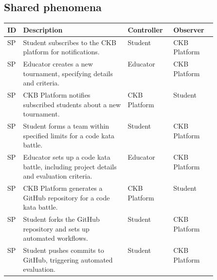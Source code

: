 \subsection{Shared phenomena}
\label{subsec:shared_phenomena}%
\setcounter{sp}{1}
\newcommand{\csp} {\thesp\stepcounter{sp}}
\begin{center}
    \begin{longtable}{ |l|p{0.5\linewidth}|l|l| }
        \hline
        \textbf{ID} & \textbf{Description}                                                                                                          & \textbf{Controller} & \textbf{Observer} \\
        \hline
        SP\csp      & Student subscribes to the CKB platform for notifications.\                                                                    & Student                 & CKB Platform             \\
        \hline
        SP\csp      & Educator creates a new tournament, specifying details and criteria.\                                                          & Educator                 & CKB Platform            \\
        \hline
        SP\csp      & CKB Platform notifies subscribed students about a new tournament.\                                                            & CKB Platform                & Student             \\
        \hline
        SP\csp      & Student forms a team within specified limits for a code kata battle.\                                                         & Student               & CKB Platform               \\
        \hline
        SP\csp      & Educator sets up a code kata battle, including project details and evaluation criteria.\                                      & Educator                 & CKB Platform            \\
        \hline
        SP\csp      & CKB Platform generates a GitHub repository for a code kata battle.                                                            & CKB Platform               & Student               \\
        \hline
        SP\csp      & Student forks the GitHub repository and sets up automated workflows.                                                          & Student                 & CKB Platform             \\
        \hline
        SP\csp      & Student pushes commits to GitHub, triggering automated evaluation.                                                            & Student              & CKB Platform               \\

\end{longtable}
\end{center}
